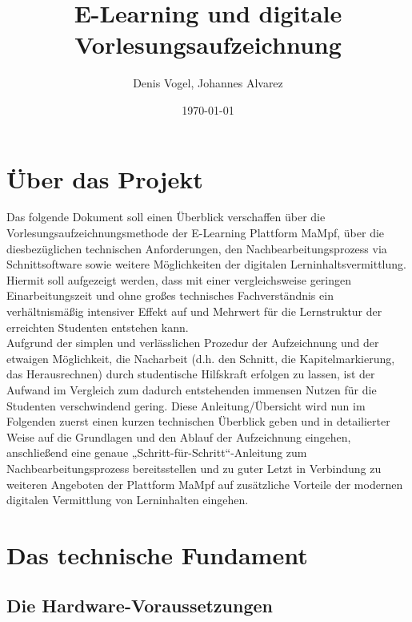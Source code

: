\documentclass{scrreprt}
\title{E-Learning und digitale Vorlesungsaufzeichnung}
\author{Denis Vogel, Johannes Alvarez}
\date{\today}
\begin{document}


\renewcommand\contentsname{Themen}


\maketitle
\tableofcontents


\chapter*{Über das Projekt}
Das folgende Dokument soll einen Überblick verschaffen über die Vorlesungsaufzeichnungsmethode der E-Learning Plattform MaMpf, über die diesbezüglichen technischen Anforderungen, den Nachbearbeitungsprozess via Schnittsoftware sowie weitere Möglichkeiten der digitalen Lerninhaltsvermittlung.
Hiermit soll aufgezeigt werden, dass mit einer vergleichsweise geringen Einarbeitungszeit und ohne großes technisches Fachverständnis ein verhältnismäßig intensiver Effekt auf und Mehrwert für die Lernstruktur der erreichten Studenten entstehen kann.\\
Aufgrund der simplen und verlässlichen Prozedur der Aufzeichnung und der etwaigen Möglichkeit, die Nacharbeit (d.h. den Schnitt, die Kapitelmarkierung, das Herausrechnen) durch studentische Hilfskraft erfolgen zu lassen, ist der Aufwand im Vergleich zum dadurch entstehenden immensen Nutzen für die Studenten verschwindend gering. Diese Anleitung/Übersicht wird nun im Folgenden zuerst einen kurzen technischen Überblick geben und in detailierter Weise auf die Grundlagen und den Ablauf der Aufzeichnung eingehen, anschließend eine genaue „Schritt-für-Schritt“-Anleitung zum Nachbearbeitungsprozess bereitsstellen und zu guter Letzt in Verbindung zu weiteren Angeboten der Plattform MaMpf auf zusätzliche Vorteile der modernen digitalen Vermittlung von Lerninhalten eingehen. 


\chapter{Das technische Fundament}

\section{Die Hardware-Voraussetzungen}
\end{document}
